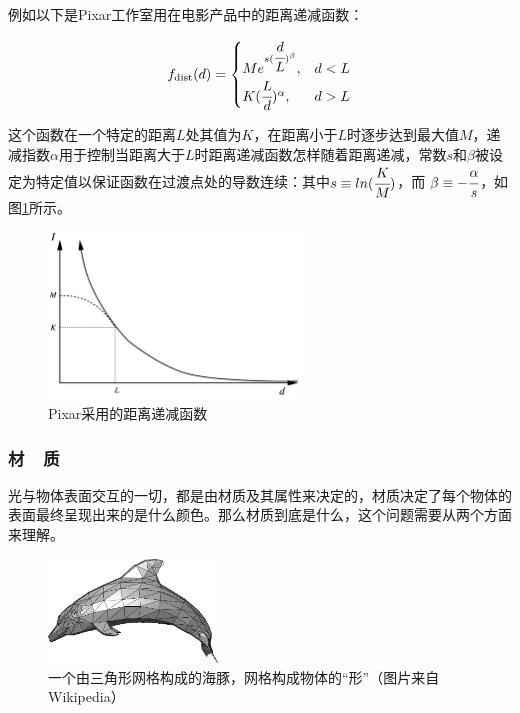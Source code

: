 例如以下是Pixar工作室\cite{a:LightingControlsforComputerCinematography}用在电影产品中的距离递减函数：

\begin{equation}
	f_{\rm dist}(d)=\begin{cases}
		Me^{s( \cfrac{d}{L})^{\beta}}, & d<L\\
		K( \cfrac{L}{d})^{\alpha}, &d>L
	\end{cases}
\end{equation}

\noindent 这个函数在一个特定的距离$L$处其值为$K$，在距离小于$L$时逐步达到最大值$M$，递减指数$\alpha$用于控制当距离大于$L$时距离递减函数怎样随着距离递减，常数$s$和$\beta$被设定为特定值以保证函数在过渡点处的导数连续：其中$s\equiv ln( \cfrac{K}{M})$，而 $\beta\equiv - \cfrac{\alpha}{s}$，如图\ref{f:intro-falloff}所示。

\begin{figure}
\sidecaption
	\includegraphics[width=0.6\textwidth]{figures/intro/falloff}
	\caption{Pixar采用的距离递减函数}
	\label{f:intro-falloff}
\end{figure}




\subsubsection{材~~质}\label{sec:intro-materials}
光与物体表面交互的一切，都是由材质及其属性来决定的，材质决定了每个物体的表面最终呈现出来的是什么颜色。那么材质到底是什么，这个问题需要从两个方面来理解。

\begin{figure}
\sidecaption
	\includegraphics[width=0.4\textwidth]{figures/intro/mesh}
	\caption{一个由三角形网格构成的海豚，网格构成物体的“形”（图片来自Wikipedia）}
	\label{f:intro-mesh}
\end{figure}

